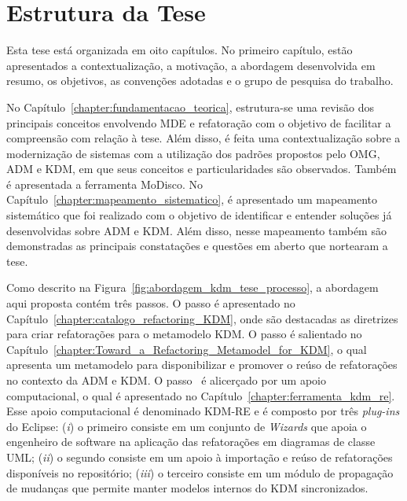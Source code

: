 \section{Estrutura da Tese}

Esta tese está organizada em oito capítulos. No primeiro capítulo, estão apresentados a contextualização, a motivação, a abordagem desenvolvida em resumo, os objetivos, as convenções adotadas e o grupo de pesquisa do trabalho. 

No Capítulo~\ref{chapter:fundamentacao_teorica}, estrutura-se uma revisão dos principais conceitos envolvendo MDE e refatoração com o objetivo de facilitar a compreensão  com relação à tese. Além disso, é feita uma contextualização sobre a modernização de sistemas com a utilização dos padrões propostos pelo OMG, ADM e KDM, em que seus conceitos e particularidades são observados. Também é apresentada a ferramenta MoDisco. 
%
%
No Capítulo~\ref{chapter:mapeamento_sistematico}, é apresentado um mapeamento sistemático que foi realizado com o objetivo de identificar e entender soluções já desenvolvidas sobre ADM e KDM. Além disso, nesse mapeamento também são demonstradas as principais constatações e questões em aberto que nortearam a tese.

Como descrito na Figura~\ref{fig:abordagem_kdm_tese_processo}, a abordagem aqui proposta contém três passos. O passo  é apresentado no Capítulo~\ref{chapter:catalogo_refactoring_KDM}, onde são destacadas as diretrizes para criar refatorações para o metamodelo KDM. O passo  é salientado no Capítulo~\ref{chapter:Toward_a_Refactoring_Metamodel_for_KDM}, o qual apresenta um metamodelo para disponibilizar e promover o reúso de refatorações no contexto da ADM e KDM. %
%
O passo~ é alicerçado por um apoio computacional, o qual é apresentado no Capítulo~\ref{chapter:ferramenta_kdm_re}. Esse apoio computacional é denominado KDM-RE e é composto por três \textit{plug-ins} do Eclipse: (\textit{i}) o primeiro consiste em um conjunto de \textit{Wizards} que apoia o engenheiro de software na aplicação das refatorações em diagramas de classe UML; (\textit{ii}) o segundo consiste em um apoio à importação e reúso de refatorações disponíveis no repositório; (\textit{iii}) o terceiro consiste em um módulo de propagação de mudanças que permite manter modelos internos do KDM sincronizados.


